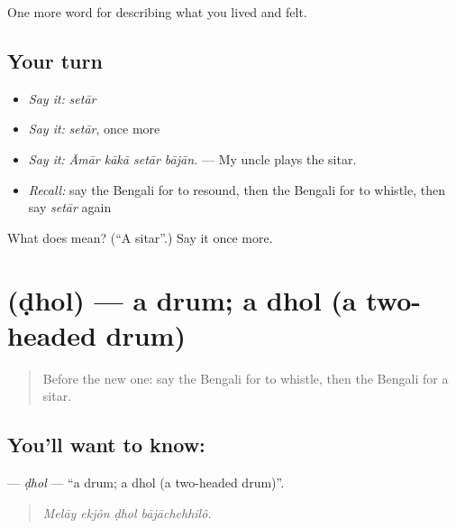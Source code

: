 \begin{grammarlens}[title={What you've built}]
One more word for describing what you lived and felt.
\end{grammarlens}

\subsection*{Your turn}
\begin{itemize}
\raggedright
  \item \emph{Say it:} \emph{setār}
  \item \emph{Say it:} \emph{setār}, once more
  \item \emph{Say it:} \emph{Āmār kākā setār bājān.} — My uncle plays the sitar.
  \item \emph{Recall:} say the Bengali for to resound, then the Bengali for to whistle, then say \emph{setār} again
\end{itemize}

\begin{tcolorbox}[breakable,colback=teal!4,colframe=teal!35!black,title={Before you move on}]
What does  mean? (\textquotedblleft{}A sitar\textquotedblright{}.) Say it once more.
\end{tcolorbox}
\section[\texorpdfstring{\bn{ঢোল} (ḍhol)}{ঢোল (ḍhol)}]{ (ḍhol) — a drum; a dhol (a two-headed drum)}

\label{lesson:BN-C526-dhol}



\begin{quote}
Before the new one: say the Bengali for to whistle, then the Bengali for a sitar.
\end{quote}

\subsection*{You'll want to know: }
\textbf{} — \emph{ḍhol} — \textquotedblleft{}a drum; a dhol (a two-headed drum)\textquotedblright{}.

\begin{quote}
   
\end{quote}

\begin{quote}
\emph{Melāy ekjôn ḍhol bājāchchhilô.}
\end{quote}

